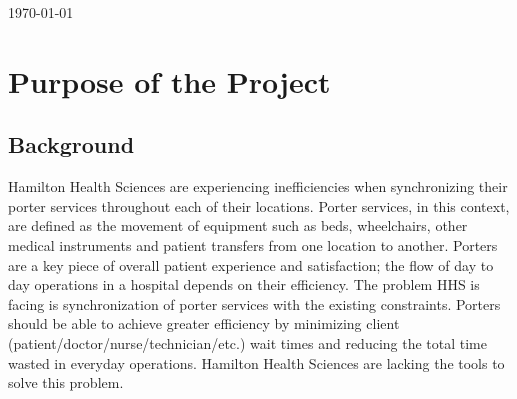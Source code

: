 \documentclass[paper=letter, fontsize=10pt]{scrartcl}
\numberwithin{equation}{section}		%
\numberwithin{figure}{section}			%
\numberwithin{table}{section}				%
\begin{document}
\begin{titlepage}
\begin{center}


{\large \today}\\[3cm] %


 

\vfill %
\end{center}
\end{titlepage}

\setcounter{tocdepth}{2}

\tableofcontents

\newpage

\section{Purpose of the Project}
\subsection{Background}
Hamilton Health Sciences are experiencing inefficiencies when synchronizing their porter services throughout each of their locations. Porter services, in this context, are defined as the movement of equipment such as beds, wheelchairs, other medical instruments and patient transfers from one location to another. Porters are a key piece of overall patient experience and satisfaction; the flow of day to day operations in a hospital depends on their efficiency. The problem HHS is facing is synchronization of porter services with the existing constraints.  Porters should be able to achieve greater efficiency by minimizing client (patient/doctor/nurse/technician/etc.) wait times and reducing the total time wasted in everyday operations. Hamilton Health Sciences are lacking the tools to solve this problem.
\end{document}
